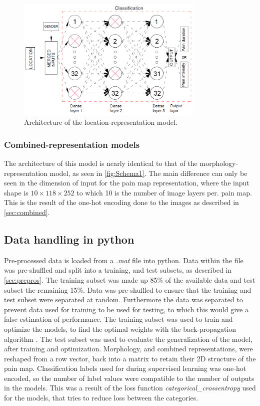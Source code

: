 \begin{figure} [H]
\centering
\includegraphics[width=0.8\textwidth]{figures/locationar}
\caption{Architecture of the location-representation model.}
\label{fig:locationar} 
\end{figure}

\subsubsection{Combined-representation models}
The architecture of this model is nearly identical to that of the morphology-representation model, as seen in \autoref{fig:Schema1}. 
The main difference can only be seen in the dimension of input for the pain map representation, where the input shape is $10 \times 118 \times 252$ to which 10 is the number of image layers per. pain map. This is the result of the one-hot encoding done to the images as described in \ref{sec:combined}. 


\subsection{Data handling in python}
Pre-processed data is loaded from a \textit{.mat} file into python.
Data within the file was pre-shuffled and split into a training, and test subsets, as described in \autoref{sec:prepros}. The training subset was made up 85\% of the available data and test subset the remaining 15\%. Data was pre-shuffled to ensure that the training and test subset were separated at random. Furthermore the data was separated to prevent data used for training to be used for testing, to which this would give a false estimation of performance.  
The training subset was used to train and optimize the models, to find the optimal weights with the back-propagation algorithm \citep{Bengio2012}. 
The test subset was used to evaluate the generalization of the model, after training and optimization.
Morphology, and combined representations, were reshaped from a row vector, back into a matrix to retain their 2D structure of the pain map.
Classification labels used for during supervised learning was one-hot encoded, so the number of label values were compatible to the number of outputs in the models. This was a result of the loss function \textit{categorical\_crossentropy} used for the models, that tries to reduce loss between the categories.    
\newpage

